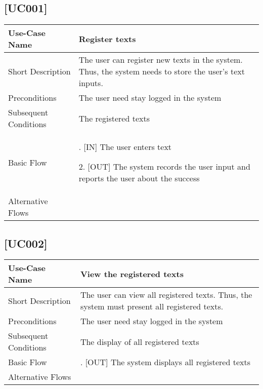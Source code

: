 \documentclass[11pt, twoside, a4paper]{book}
\begin{document}
			\subsection{[UC001]}
				\begin{tabular}{|>{\centering\arraybackslash}m{3cm} |>{\arraybackslash}m{9cm}|}												   \hline
					Use-Case Name 			& Register texts																							\\ \hline
					Short Description  		& The user can register new texts in the system. Thus, the system needs to store the user's text inputs.    \\ \hline	
					Preconditions  			& The user need stay logged in the system      																\\ \hline
					Subsequent Conditions	& The registered texts     																					\\ \hline
					Basic Flow  			& 	1. [IN] The user enters text
										
												2. [OUT] The system records the user input and reports the user about the success								\\ \hline
					Alternative Flows  		&       																									\\ \hline
				\end{tabular}
			
			\subsection{[UC002]}			
				\begin{tabular}{|>{\centering\arraybackslash}m{3cm} |>{\arraybackslash}m{9cm}|}										   \hline
					Use-Case Name 			& [UC002] View the registered texts																	\\ \hline
					Short Description  		& The user can view all registered texts. Thus, the system must present all registered texts.    	\\ \hline	
					Preconditions  			& The user need stay logged in the system      														\\ \hline
					Subsequent Conditions	& The display of all registered texts																\\ \hline
					Basic Flow  			& 	1. [OUT] The system displays all registered texts														\\ \hline
				Alternative Flows  		&       																								\\ \hline
			\end{tabular}
\end{document}
